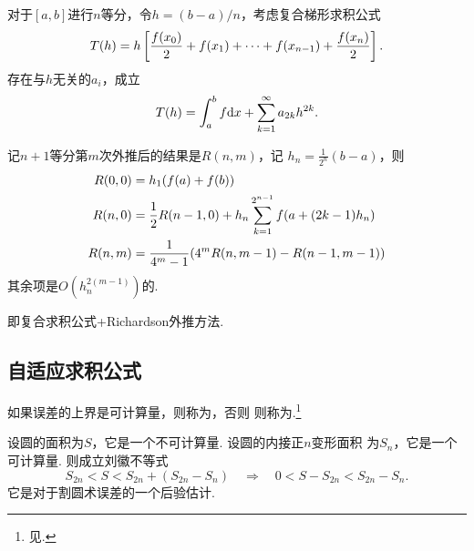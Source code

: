   \begin{pos}
    \label{pos: 复合梯形公式余项}
    对于$[a, b]$进行$n$等分，令$h = (b-a)/n$，考虑复合梯形求积公式
    \[
      T(h) = h\left[ \frac{\mathnormal{f}(x_0)}{2} + \mathnormal{f}(x_1)
      +\cdots + \mathnormal{f}(x_{n-1}) + \frac{\mathnormal{f}(x_n)}{2} \right].
    \]
    存在与$h$无关的$a_i$，成立
    \[
      T(h) = \int_a^b\mathnormal{f}\mathrm{d} x + \sum_{k=1}^\infty a_{2k}h^{2k}.
    \]
  \end{pos}

  \begin{alg}[Romberg算法]
    记$n+1$等分第$m$次外推后的结果是$R(n, m)$，记
    $h_n = \frac{1}{2^n}(b-a)$，则
    \[\begin{split}
      R(0, 0) &= h_1(\mathnormal{f}(a) + \mathnormal{f}(b)) \\
      R(n, 0) &= \frac{1}{2}R(n-1, 0)
      + h_n\sum_{k=1}^{2^{n-1}}\mathnormal{f}(a+(2k-1)h_n) \\
      R(n, m) &= \frac{1}{4^m-1}(
        4^mR(n,m-1) - R(n-1,m-1)
      )
    \end{split}\]
    其余项是$O(h_n^{2(m-1)})$的.
  \end{alg}
  \remark
    即复合求积公式+Richardson外推方法.

\subsection{自适应求积公式}
  \begin{defi}[后验估计]
    如果误差的上界是可计算量，则称为，否则
    则称为.\footnote{见.}
  \end{defi}

  \begin{exa}[刘徽割圆术]
    \label{exa: 刘徽割圆术}
    设圆的面积为$S$，它是一个不可计算量. 设圆的内接正$n$变形面积
    为$S_n$，它是一个可计算量. 则成立刘徽不等式
    \[
      S_{2n} < S < S_{2n} + (S_{2n} - S_n)
      \quad\Rightarrow\quad
      0 < S - S_{2n} < S_{2n} - S_n.
    \]
    它是对于割圆术误差的一个后验估计.
  \end{exa}

